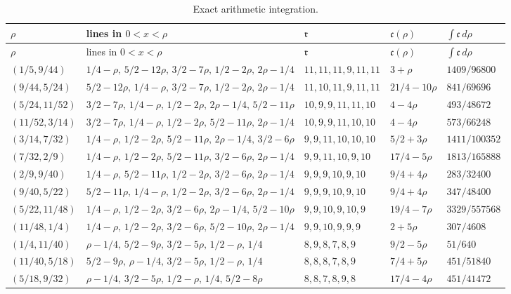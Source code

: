 \documentclass{amsart}
\numberwithin{equation}{section}
\numberwithin{table}{section}
\begin{document}
\begingroup
\footnotesize
\setlength{\tabcolsep}{3pt}
\renewcommand{\arraystretch}{1.05}
\begin{longtable}{@{}lllll@{}}
\caption{Exact arithmetic integration.}\label{tab:arithmetic}\\
\hline
$\rho$ & lines in $0<x<\rho$ & $\mathfrak r$ & $\mathfrak c(\rho)$ & $\int \mathfrak c\,d\rho$\\
\hline
\endfirsthead
\hline
$\rho$ & lines in $0<x<\rho$ & $\mathfrak r$ & $\mathfrak c(\rho)$ & $\int \mathfrak c\,d\rho$\\
\hline
\endhead
$(1/5,9/44)$ & $1/4-\rho,\,5/2-12\rho,\,3/2-7\rho,\,1/2-2\rho,\,2\rho-1/4$ & $11,11,11,9,11,11$ & $3+\rho$ & $1409/96800$\\
$(9/44,5/24)$ & $5/2-12\rho,\,1/4-\rho,\,3/2-7\rho,\,1/2-2\rho,\,2\rho-1/4$ & $11,10,11,9,11,11$ & $21/4-10\rho$ & $841/69696$\\
$(5/24,11/52)$ & $3/2-7\rho,\,1/4-\rho,\,1/2-2\rho,\,2\rho-1/4,\,5/2-11\rho$ & $10,9,9,11,11,10$ & $4-4\rho$ & $493/48672$\\
$(11/52,3/14)$ & $3/2-7\rho,\,1/4-\rho,\,1/2-2\rho,\,5/2-11\rho,\,2\rho-1/4$ & $10,9,9,11,10,10$ & $4-4\rho$ & $573/66248$\\
$(3/14,7/32)$ & $1/4-\rho,\,1/2-2\rho,\,5/2-11\rho,\,2\rho-1/4,\,3/2-6\rho$ & $9,9,11,10,10,10$ & $5/2+3\rho$ & $1411/100352$\\
$(7/32,2/9)$ & $1/4-\rho,\,1/2-2\rho,\,5/2-11\rho,\,3/2-6\rho,\,2\rho-1/4$ & $9,9,11,10,9,10$ & $17/4-5\rho$ & $1813/165888$\\
$(2/9,9/40)$ & $1/4-\rho,\,5/2-11\rho,\,1/2-2\rho,\,3/2-6\rho,\,2\rho-1/4$ & $9,9,9,10,9,10$ & $9/4+4\rho$ & $283/32400$\\
$(9/40,5/22)$ & $5/2-11\rho,\,1/4-\rho,\,1/2-2\rho,\,3/2-6\rho,\,2\rho-1/4$ & $9,9,9,10,9,10$ & $9/4+4\rho$ & $347/48400$\\
$(5/22,11/48)$ & $1/4-\rho,\,1/2-2\rho,\,3/2-6\rho,\,2\rho-1/4,\,5/2-10\rho$ & $9,9,10,9,10,9$ & $19/4-7\rho$ & $3329/557568$\\
$(11/48,1/4)$ & $1/4-\rho,\,1/2-2\rho,\,3/2-6\rho,\,5/2-10\rho,\,2\rho-1/4$ & $9,9,10,9,9,9$ & $2+5\rho$ & $307/4608$\\
$(1/4,11/40)$ & $\rho-1/4,\,5/2-9\rho,\,3/2-5\rho,\,1/2-\rho,\,1/4$ & $8,9,8,7,8,9$ & $9/2-5\rho$ & $51/640$\\
$(11/40,5/18)$ & $5/2-9\rho,\,\rho-1/4,\,3/2-5\rho,\,1/2-\rho,\,1/4$ & $8,8,8,7,8,9$ & $7/4+5\rho$ & $451/51840$\\
$(5/18,9/32)$ & $\rho-1/4,\,3/2-5\rho,\,1/2-\rho,\,1/4,\,5/2-8\rho$ & $8,8,7,8,9,8$ & $17/4-4\rho$ & $451/41472$\\

\end{longtable}
\end{document}
